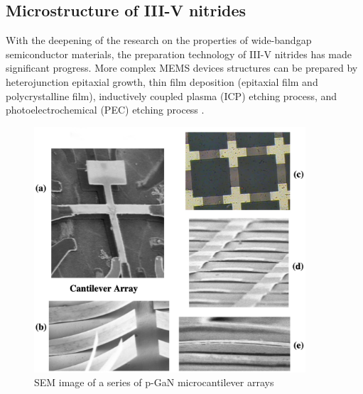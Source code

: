 \subsection{Microstructure of III-V nitrides}

With the deepening of the research on the properties of wide-bandgap semiconductor materials, the preparation technology of III-V  nitrides has made significant progress. More complex MEMS  devices structures can be prepared by heterojunction epitaxial  growth, thin film  deposition (epitaxial film and polycrystalline film), inductively coupled plasma (ICP)  etching process, and photoelectrochemical (PEC) etching process \cite{strittmatter2004development,zorman2008micro,brueckner2011micro,yamada2021fabrication,davies2004fabrication,lv2011characterization-a,lv2011characterization-b}.

\begin{figure}[H] 
\centering    
\includegraphics[width=0.9\textwidth]{ch1_18}
\caption[SEM image of a series of p-GaN microcantilever arrays]{SEM image of a series of p-GaN microcantilever arrays \protect\cite{strittmatter2004development}}
\label{fig:1.18}
\end{figure}

